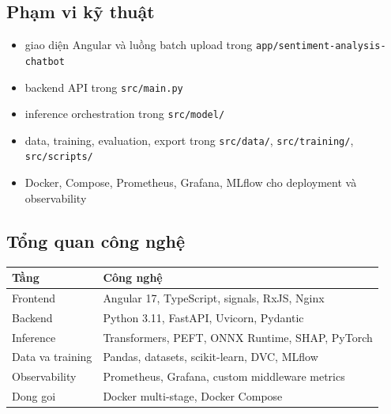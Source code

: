 \subsection{Phạm vi kỹ thuật}
\begin{itemize}[leftmargin=1.2em]
  \item giao diện Angular và luồng batch upload trong \texttt{app/sentiment-analysis-chatbot}
  \item backend API trong \texttt{src/main.py}
  \item inference orchestration trong \texttt{src/model/}
  \item data, training, evaluation, export trong \texttt{src/data/}, \texttt{src/training/}, \texttt{src/scripts/}
  \item Docker, Compose, Prometheus, Grafana, MLflow cho deployment và observability
\end{itemize}

\subsection{Tổng quan công nghệ}
\begin{table}[H]
\centering
\begin{tabularx}{\textwidth}{@{}lX@{}}
\toprule
\textbf{Tầng} & \textbf{Công nghệ} \\
\midrule
Frontend & Angular 17, TypeScript, signals, RxJS, Nginx \\
Backend & Python 3.11, FastAPI, Uvicorn, Pydantic \\
Inference & Transformers, PEFT, ONNX Runtime, SHAP, PyTorch \\
Data va training & Pandas, datasets, scikit-learn, DVC, MLflow \\
Observability & Prometheus, Grafana, custom middleware metrics \\
Dong goi & Docker multi-stage, Docker Compose \\
\bottomrule
\end{tabularx}
\end{table}

